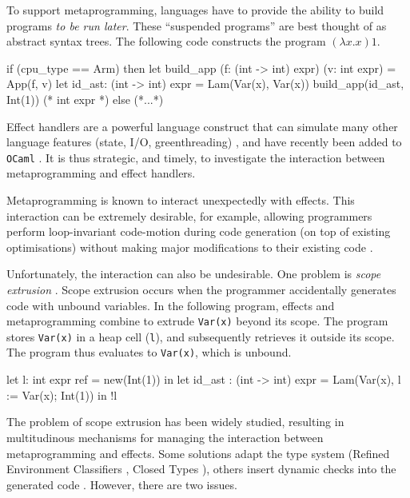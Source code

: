 To support metaprogramming, languages have to provide the ability to build programs \textit{to be run later}. These ``suspended programs'' are best thought of as abstract syntax trees. The following code constructs the program $(\lambda x. x) 1$.
\begin{ocaml}
if (cpu_type == Arm) then 
  let build_app (f: (int -> int) expr) (v: int expr) = App(f, v)
  let id_ast: (int -> int) expr = Lam(Var(x), Var(x))
  build_app(id_ast, Int(1)) (* int expr *)
else 
  (*...*)
\end{ocaml}

Effect handlers are a powerful language construct that can simulate many other language features (state, I/O, greenthreading) \citep{pretnar-15}, and have recently been added to \texttt{OCaml} \citep{sivaramakrishnan-21}.  It is thus strategic, and timely, to investigate the interaction between metaprogramming and effect handlers. 

Metaprogramming is known to interact unexpectedly with effects. This interaction can be extremely desirable, for example, allowing programmers perform loop-invariant code-motion during code generation (on top of existing optimisations) \citep{kiselyov-14} without making major modifications to their existing code \citep{lawall-94}. 

Unfortunately, the interaction can also be undesirable. One problem is \textit{scope extrusion} \citep{kiselyov-14}. Scope extrusion occurs when the programmer accidentally generates code with unbound variables. In the following program, effects and metaprogramming combine to extrude \texttt{Var(x)} beyond its scope. The program stores \texttt{Var(x)} in a heap cell (\texttt{l}), and subsequently retrieves it outside its scope. The program thus evaluates to \texttt{Var(x)}, which is unbound.

\begin{ocaml}
let l: int expr ref = new(Int(1)) in 
let id_ast : (int -> int) expr = Lam(Var(x), l := Var(x); Int(1)) in
!l
\end{ocaml} 

The problem of scope extrusion has been widely studied, resulting in multitudinous mechanisms for managing the interaction between metaprogramming and effects. Some solutions adapt the type system (Refined Environment Classifiers \citep{kiselyov-16,isoda-24}, Closed Types \citep{calcagno-00}), others insert dynamic checks into the generated code \citep{kiselyov-14}. However, there are two issues.

